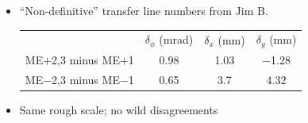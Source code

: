 \documentclass[compress]{beamer}
\begin{document}
\begin{frame}
\begin{itemize}
\item ``Non-definitive'' transfer line numbers from Jim B.

\begin{center}\renewcommand{\arraystretch}{1.25}
\begin{tabular}{c c c c}
& $\delta_{\phi}$ (mrad) & $\delta_x$ (mm) & $\delta_y$ (mm) \\
ME$+$2,3 minus ME$+$1 & 0.98 & 1.03 & $-$1.28 \\
ME$-$2,3 minus ME$-$1 & 0.65 & 3.7 & 4.32
\end{tabular}
\end{center}

\item Same rough scale; no wild disagreements
\end{itemize}
\end{frame}
\end{document}
